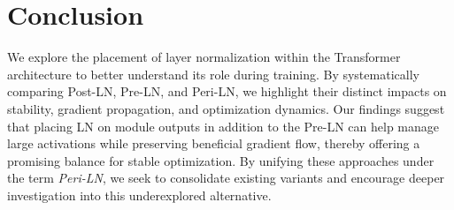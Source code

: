 
\section{Conclusion}\label{sec:conclusion}
We explore the placement of layer normalization within the Transformer architecture to better understand its role during training. By systematically comparing Post-LN, Pre-LN, and Peri-LN, we highlight their distinct impacts on stability, gradient propagation, and optimization dynamics. Our findings suggest that placing LN on module outputs in addition to the Pre-LN can help manage large activations while preserving beneficial gradient flow, thereby offering a promising balance for stable optimization. By unifying these approaches under the term \emph{Peri-LN}, we seek to consolidate existing variants and encourage deeper investigation into this underexplored alternative.


